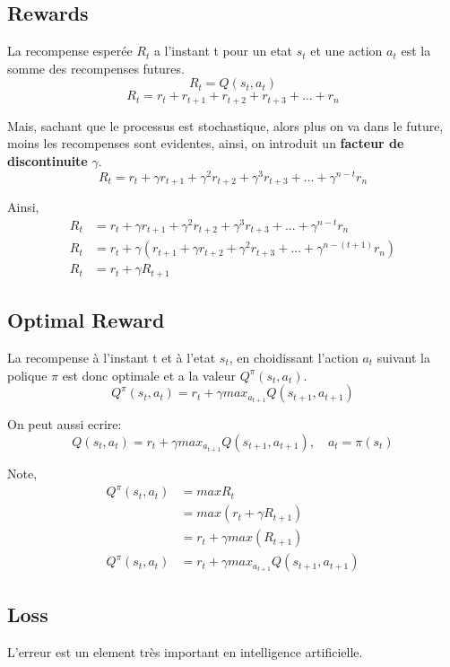\documentclass{article}
\begin{document}
\subsection{Rewards}

La recompense esperée $R_t$ a l'instant t pour un etat $s_t$ et une action $a_t$ est la somme des recompenses futures.
$$R_t=Q(s_t,a_t)$$
$$R_t=r_t+r_{t+1}+r_{t+2}+r_{t+3}+...+r_n$$

Mais, sachant que le processus est stochastique, alors plus on va dans le future, moins les recompenses sont evidentes, ainsi, on introduit un \textbf{facteur de discontinuite} $\gamma$.  
$$R_t=r_t+{\gamma}r_{t+1}+{\gamma^2}r_{t+2}+{\gamma^3}r_{t+3}+...+{\gamma^{n-t}}r_n$$

Ainsi,
\begin{equation}
\begin{split}
R_t&=r_t+{\gamma}r_{t+1}+{\gamma^2}r_{t+2}+{\gamma^3}r_{t+3}+...+{\gamma^{n-t}}r_n \\
R_t&=r_t+{\gamma}(r_{t+1}+{\gamma}r_{t+2}+{\gamma^2}r_{t+3}+...+{\gamma^{n-(t+1)}}r_n) \\
R_t&=r_t+{\gamma}R_{t+1}
\end{split}
\end{equation}

\subsection{Optimal Reward}

La recompense à l'instant t et à l'etat $s_t$, en choidissant l'action $a_t$ suivant la polique $\pi$ est donc optimale et a la valeur $Q^{\pi}(s_t,a_t)$.
$$Q^{\pi}(s_t,a_t)=r_t+{\gamma}max_{a_{t+1}}{Q(s_{t+1},a_{t+1})}$$

On peut aussi ecrire:
$$Q(s_t,a_t)=r_t+{\gamma}max_{a_{t+1}}{Q(s_{t+1},a_{t+1})}, \quad a_t=\pi(s_t)$$

Note,
\begin{equation}
\begin{split}
Q^{\pi}(s_t,a_t)&=maxR_t \\
&=max(r_t+{\gamma}R_{t+1}) \\
&=r_t+{\gamma}max(R_{t+1}) \\
Q^{\pi}(s_t,a_t)&=r_t+{\gamma}max_{a_{t+1}}{Q(s_{t+1},a_{t+1})}
\end{split}
\end{equation}

\subsection{Loss}
L'erreur est un element très important en intelligence artificielle.
\end{document}
